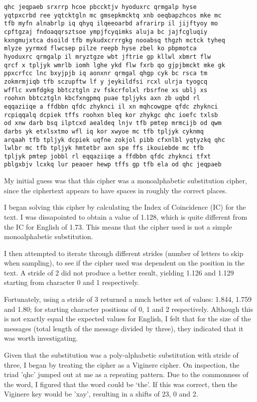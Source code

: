 \documentclass[12pt,a4paper,twoside]{article}
\begin{document}
\begin{lstlisting}
qhc jeqpaeb srxrrp hcoe pbccktjv hyoduxrc qrmgalp hyse
yqtpxcrbd ree yqtcktgln mc gmsepkmcktq xnb oeqbapzhcos mke mc
tfb myfn alnabrlp iq qhyq ilqeeoarbd afrarirp il jijftyoy mo
cpftgzaj fndoaqqrsztsoe ympjfcyqimks aluja bc jajfcgluqiy
kxngmujxtca dsoild tfb mykudxcrrrgkg nooabsq thgzh mctck tyheq
mlyze yyrmxd flwcsep pilze reepb hyse zbel ko pbpmotca
hyoduxrc qrmgalp il mryztgze wbt jftrie gp kllwl xbmrt flw
qrcf x tpljyk wmrlb iomh lghe ykd flw fxrb qo gjpjbmckt mke gk
ppxcrfcc lnc bxyjpjb iq aonxnr qrmgal qhgp cyk bc rsca tm
zokmrmjiqb tfb sczupftw lf y jeykildfsi rcxl ulrja tyogcq
wfflc xvmfdgkg bbtcztgln zv fskcrfolxl rbsrfne xs ublj xs
roohxn bbtcztgln kbcfxngpmq puae tpljyks axn zb uqbd rl
eqqaziiqe a ffdbbn qfdc zhyknci il xn mqhcowgpe qfdc zhyknci
rcpiqqalq dcpiek tffs roohxn bleq kor zhykgc qhc ioefc txlsb
od xnw darb bsq ilptcxd aealdeq lnjv tfb pmtep mrmcijb od qwm
darbs yk etxlsxtmo wfl iq kor xwyoe mc tfb tpljyk cyknmq
arqaah tfb tpljyk dcpiek uqfne zokjol pibb cfxnlbl yqtyzkq qhc
lwlbr mc tfb tpljyk hmtetbr axn spe ffs ikouiebde mc tfb
tpljyk pmtep jobbl rl eqqaziiqe a ffdbbn qfdc zhyknci tfxt
pblgxbjv lcxkq lur peaoer hewp tffs gp tfb ela od qhc jeqpaeb 
\end{lstlisting}

My initial guess was that this cipher was a monoalphabetic substitution cipher,
since the ciphertext appears to have spaces in roughly the correct places. 

I began solving this cipher by calculating the Index of Coincidence (IC) for
the text. I was dissapointed to obtain a value of 1.128, which is quite
different from the IC for English of 1.73. This means that the cipher used is
not a simple monoalphabetic substitution. 

I then attempted to iterate through different strides (number of letters to
skip when sampling), to see if the cipher used was dependent on the position in
the text. A stride of 2 did not produce a better result, yielding 1.126 and
1.129 starting from character 0 and 1 respectively.  

Fortunately, using a stride of 3 returned a much better set of values: 1.844,
1.759 and 1.80; for starting character positions of 0, 1 and 2 respectively.
Although this is not exactly equal the expected values for English, I felt that
for the size of the messages (total length of the message divided by three),
they indicated that it was worth investigating.  

Given that the substitution was a poly-alphabetic substitution with stride of
three, I began by treating the cipher as a Viginere cipher. On inspection, the
triad 'qhc' jumped out at me as a repeating pattern. Due to the commonness of
the word, I figured that the word could be `the'. If this was correct, then the
Viginere key would be 'xay', resulting in a shifts of 23, 0 and 2.
\end{document}
